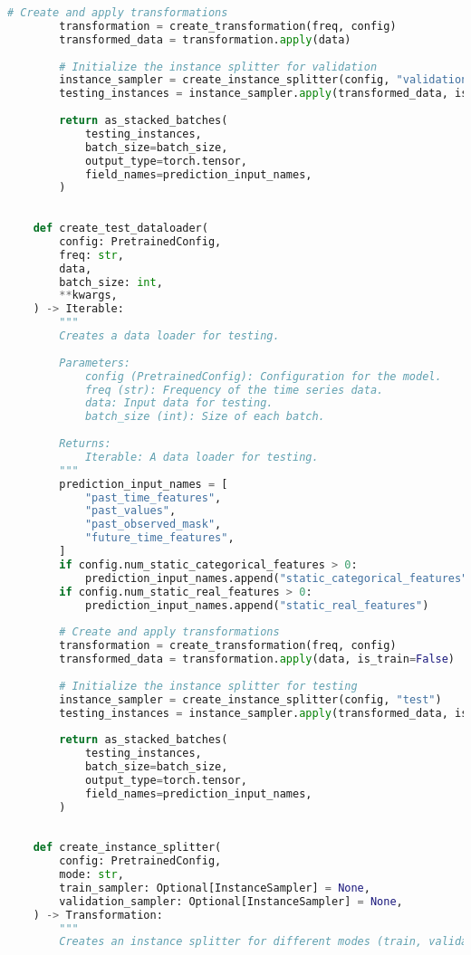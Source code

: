 \begin{lstlisting}[language=Python, caption={Code for creating data loaders for efficient training and evaluation}, breaklines=true, label=code4]
        # Create and apply transformations
        transformation = create_transformation(freq, config)
        transformed_data = transformation.apply(data)
    
        # Initialize the instance splitter for validation
        instance_sampler = create_instance_splitter(config, "validation")
        testing_instances = instance_sampler.apply(transformed_data, is_train=True)
    
        return as_stacked_batches(
            testing_instances,
            batch_size=batch_size,
            output_type=torch.tensor,
            field_names=prediction_input_names,
        )
    
    
    def create_test_dataloader(
        config: PretrainedConfig,
        freq: str,
        data,
        batch_size: int,
        **kwargs,
    ) -> Iterable:
        """
        Creates a data loader for testing.
    
        Parameters:
            config (PretrainedConfig): Configuration for the model.
            freq (str): Frequency of the time series data.
            data: Input data for testing.
            batch_size (int): Size of each batch.
    
        Returns:
            Iterable: A data loader for testing.
        """
        prediction_input_names = [
            "past_time_features",
            "past_values",
            "past_observed_mask",
            "future_time_features",
        ]
        if config.num_static_categorical_features > 0:
            prediction_input_names.append("static_categorical_features")
        if config.num_static_real_features > 0:
            prediction_input_names.append("static_real_features")
    
        # Create and apply transformations
        transformation = create_transformation(freq, config)
        transformed_data = transformation.apply(data, is_train=False)
    
        # Initialize the instance splitter for testing
        instance_sampler = create_instance_splitter(config, "test")
        testing_instances = instance_sampler.apply(transformed_data, is_train=False)
    
        return as_stacked_batches(
            testing_instances,
            batch_size=batch_size,
            output_type=torch.tensor,
            field_names=prediction_input_names,
        )
    
    
    def create_instance_splitter(
        config: PretrainedConfig,
        mode: str,
        train_sampler: Optional[InstanceSampler] = None,
        validation_sampler: Optional[InstanceSampler] = None,
    ) -> Transformation:
        """
        Creates an instance splitter for different modes (train, validation, test).
    

\end{lstlisting}
